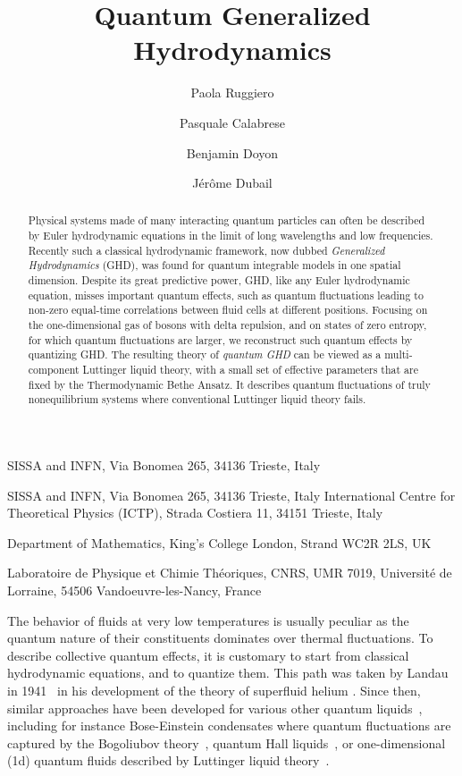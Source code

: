 \documentclass[twocolumn,amsfonts,showpacs,superscriptaddress]{revtex4-1}
\begin{document}
\title{Quantum Generalized Hydrodynamics}


\author{Paola Ruggiero}
\affiliation
{SISSA and INFN, Via Bonomea 265, 34136 Trieste, Italy}
\author{Pasquale Calabrese}
\affiliation
{SISSA and INFN, Via Bonomea 265, 34136 Trieste, Italy}
\affiliation
{International Centre for Theoretical Physics (ICTP), Strada Costiera 11, 34151 Trieste, Italy}
\author{Benjamin Doyon}
\affiliation
{Department of Mathematics, King’s College London, Strand WC2R 2LS, UK}
\author{J\'er\^ome Dubail}
\affiliation
{Laboratoire de Physique et Chimie Th\'eoriques, CNRS, UMR 7019, Universit\'e de Lorraine, 54506 Vandoeuvre-les-Nancy, France
}



\begin{abstract}
Physical systems made of many interacting quantum particles can often be described by Euler hydrodynamic equations in the limit of long wavelengths and low frequencies. Recently such a classical hydrodynamic framework, now dubbed {\it Generalized Hydrodynamics} (GHD), was found for quantum integrable models in one spatial dimension. Despite its great predictive power, GHD, like any Euler hydrodynamic equation, misses important quantum effects, such as quantum fluctuations leading to non-zero equal-time correlations between fluid cells at different positions. Focusing on the one-dimensional gas of bosons with delta repulsion, and on states of zero entropy, for which quantum fluctuations are larger, we reconstruct such quantum effects by quantizing GHD. The resulting theory of {\it quantum GHD} can be viewed as a multi-component Luttinger liquid theory, with a small set of effective parameters that are fixed by the Thermodynamic Bethe Ansatz. It describes quantum fluctuations of truly nonequilibrium systems where conventional Luttinger liquid theory fails.
\end{abstract}


\maketitle


The behavior of fluids at very low temperatures is usually peculiar as the quantum nature of their constituents dominates over thermal fluctuations. To describe collective quantum effects, it is customary to start from classical hydrodynamic equations, and to quantize them. This path was taken by Landau in 1941~\cite{landau1941theory} in his development of the theory of superfluid helium \cite{khalatnikov2018introduction,putterman1974superfluid}. Since then, similar approaches have been developed for various other quantum liquids~\cite{nozieres2018theory,leggett2006quantum}, including for instance Bose-Einstein condensates where quantum fluctuations are captured by the Bogoliubov theory~\cite{bogolyubov1947theory,pitaevskii2016bose,mora2003extension}, quantum Hall liquids~\cite{wiegmann2013hydrodynamics,wiegmann2014anomalous,wiegmann2019quantization}, 
or one-dimensional (1d) quantum fluids described by Luttinger liquid theory~\cite{haldane1981luttinger,giamarchi2003quantum,cazalilla2004bosonizing}.
\end{document}
